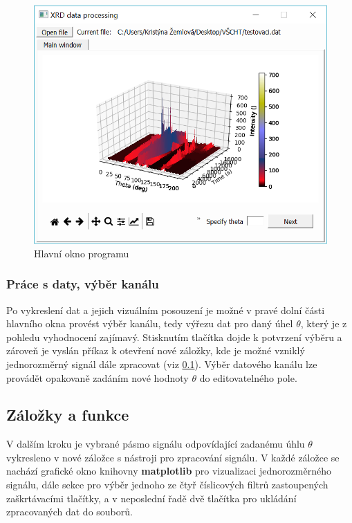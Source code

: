 \documentclass[a4paper, 12pt]{article}
\begin{document}
\begin{figure}[hbt!]
    \centering
    \includegraphics[width=\linewidth]{mainWin_grph.PNG}
    \caption{Hlavní okno programu}
    \label{fig:mainWin}
\end{figure}

\subsubsection{Práce s daty, výběr kanálu} \label{sec:channel}
Po vykreslení dat a jejich vizuálním posouzení je možné v pravé dolní části hlavního okna provést výběr kanálu, tedy výřezu dat pro daný úhel $\theta$, který je z pohledu vyhodnocení zajímavý. Stisknutím tlačítka  dojde k potvrzení výběru a zároveň je vyslán příkaz k otevření nové záložky, kde je možné vzniklý jednorozměrný signál dále zpracovat (viz \ref{sec:fcntabs}). Výběr datového kanálu lze provádět opakovaně zadáním nové hodnoty $\theta$ do editovatelného pole.

\subsection{Záložky a funkce} \label{sec:fcntabs}
V dalším kroku je vybrané pásmo signálu odpovídající zadanému úhlu $\theta$ vykresleno v nové záložce s nástroji pro zpracování signálu. V každé záložce se nachází grafické okno knihovny \textbf{matplotlib} pro vizualizaci jednorozměrného signálu, dále sekce pro výběr jednoho ze čtyř číslicových filtrů zastoupených zaškrtávacími tlačítky, a v neposlední řadě dvě tlačítka pro ukládání zpracovaných dat do souborů.
\end{document}
